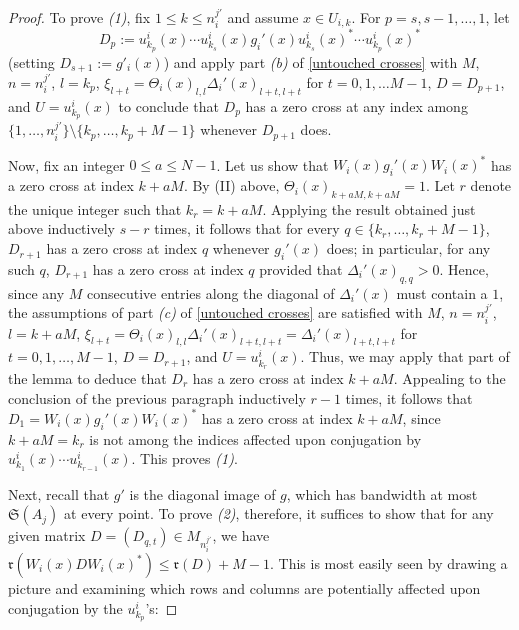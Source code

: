\documentclass[12pt]{amsart}
\numberwithin{equation}{section}
\theoremstyle{definition}
\theoremstyle{remark}
\begin{document}
\begin{proof}
	To prove \textit{(1)}, fix $1\leq k\leq n_{i}^{j'}$ and assume $x\in U_{i,k}$. For $p=s,s-1,\ldots,1$, let 
	$$
	D_{p}:=u_{k_{p}}^{i}(x)\cdots u_{k_{s}}^{i}(x)g_{i}'(x)u_{k_{s}}^{i}(x)^{*}\cdots u_{k_{p}}^{i}(x)^{*}
	$$
	(setting $D_{s+1}:=g'_{i}(x)$) and apply part \textit{(b)} of \autoref{untouched crosses} with $M$, $n=n^{j'}_{i}$, $l=k_{p}$, $\xi_{l+t}=\Theta_{i}(x)_{l,l}\Delta_{i}'(x)_{l+t,l+t}$ for $t=0,1,\ldots M-1$, $D=D_{p+1}$, and $U=u_{k_{p}}^{i}(x)$ to conclude that $D_{p}$ has a zero cross at any index among $\{1,\ldots,n_{i}^{j'}\}\setminus\{k_{p},\ldots,k_{p}+M-1\}$ whenever $D_{p+1}$ does. 
	
	Now, fix an integer $0\leq a\leq N-1$. Let us show that $W_{i}(x)g_{i}'(x)W_{i}(x)^{*}$ has a zero cross at index $k+aM$. By (II) above, $\Theta_{i}(x)_{k+aM, k+aM}=1$. Let $r$ denote the unique integer such that $k_{r}=k+aM$. Applying the result obtained just above inductively $s-r$ times, it follows that for every $q\in\{k_{r},\ldots,k_{r}+M-1\}$,  $D_{r+1}$ has a zero cross at index $q$ whenever $g_{i}'(x)$ does; in particular, for any such $q$, $D_{r+1}$ has a zero cross at index $q$ provided that $\Delta_{i}'(x)_{q,q}>0$. Hence, since any $M$ consecutive entries along the diagonal of $\Delta_{i}'(x)$ must contain a $1$, the assumptions of part \textit{(c)} of \autoref{untouched crosses} are satisfied with $M$, $n=n^{j'}_{i}$, $l=k+aM$, $\xi_{l+t}=\Theta_{i}(x)_{l,l}\Delta_{i}'(x)_{l+t,l+t}=\Delta_{i}'(x)_{l+t,l+t}$ for $t=0,1,\ldots, M-1$, $D=D_{r+1}$, and $U=u_{k_{r}}^{i}(x)$. Thus, we may apply that part of the lemma to deduce that $D_{r}$ has a zero cross at index $k+aM$. Appealing to the conclusion of the previous paragraph inductively $r-1$ times, it follows that $D_{1}=W_{i}(x)g_{i}'(x)W_{i}(x)^{*}$ has a zero cross at index $k+aM$, since $k+aM=k_{r}$ is not among the indices affected upon conjugation by $u_{k_{1}}^{i}(x)\cdots u_{k_{r-1}}^{i}(x)$. This proves \textit{(1)}.
	
	Next, recall that $g'$ is the diagonal image of $g$, which has bandwidth at most $\mathfrak{S}(A_{j})$ at every point. To prove \textit{(2)}, therefore, it suffices to show that for any given matrix $D=(D_{q,t})\in M_{n_{i}^{j'}}$, we have $\mathfrak{r}(W_{i}(x)DW_{i}(x)^{*})\leq \mathfrak{r}(D)+M-1$. This is most easily seen by drawing a picture and examining which rows and columns are potentially affected upon conjugation by the $u_{k_{p}}^{i}$'s:
	

\end{proof}
\end{document}
